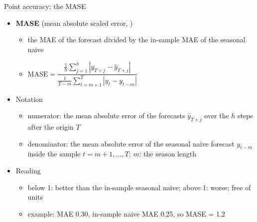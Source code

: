 \begin{frame}{Point accuracy: the MASE}
\itemsize{\footnotesize}
\begin{itemize}
    \item \textbf{MASE} (mean absolute scaled error, )
    \begin{itemize}
        \item the MAE of the forecast divided by the in-sample MAE of the seasonal naive
        \item $\text{MASE} = \dfrac{\frac1h\sum_{j=1}^{h}|y_{T+j} - \hat y_{T+j}|}{\frac{1}{T-m}\sum_{t=m+1}^{T}|y_t - y_{t-m}|}$
    \end{itemize}
    \item Notation
    \begin{itemize}
        \item numerator: the mean absolute error of the forecasts $\hat y_{T+j}$ over the $h$ steps after the origin $T$
        \item denominator: the mean absolute error of the seasonal naive forecast $y_{t-m}$ inside the sample $t = m+1, \dots, T$; $m$: the season length
    \end{itemize}
    \item Reading
    \begin{itemize}
        \item below 1: better than the in-sample seasonal naive; above 1: worse; free of units
        \item example: MAE 0.30, in-sample naive MAE 0.25, so MASE = 1.2
    \end{itemize}
\end{itemize}
\end{frame}

